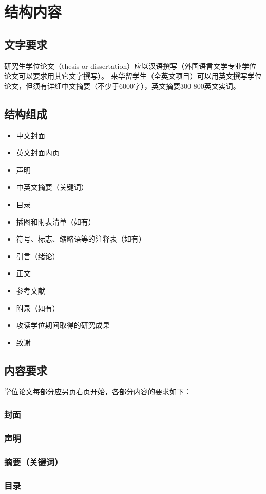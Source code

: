 \chapter{结构内容}
\section{文字要求}
研究生学位论文（thesis or dissertation）应以汉语撰写（外国语言文学专业学位论文可以要求用其它文字撰写）。
来华留学生（全英文项目）可以用英文撰写学位论文，但须有详细中文摘要（不少于6000字），英文摘要300-800英文实词。
\section{结构组成}
\begin{itemize}
\item	中文封面 
\item	英文封面内页
\item	声明
\item	中英文摘要（关键词） 
\item	目录
\item	插图和附表清单（如有）
\item	符号、标志、缩略语等的注释表（如有）
\item	引言（绪论）
\item	正文
\item	参考文献
\item	附录（如有）
\item	攻读学位期间取得的研究成果
\item	致谢
\end{itemize}
\section{内容要求}
学位论文每部分应另页右页开始，各部分内容的要求如下：
\subsection{封面}
\subsection{声明}
\subsection{摘要（关键词）}
\subsection{目录}
